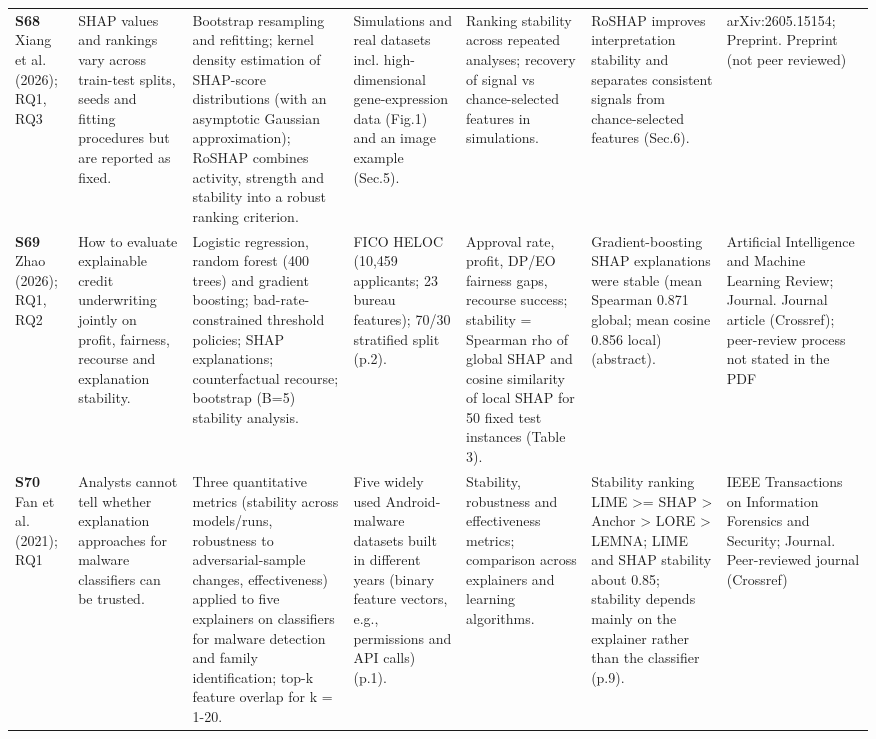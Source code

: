 \begin{longtable}{@{}P{1.55cm}P{2.9cm}P{4.5cm}P{3.2cm}P{3.4cm}P{4.6cm}P{3.6cm}@{}}
\textbf{S68} \cite{S68} Xiang et al. (2026); RQ1, RQ3 & SHAP values and rankings vary across train-test splits, seeds and fitting procedures but are reported as fixed. & Bootstrap resampling and refitting; kernel density estimation of SHAP-score distributions (with an asymptotic Gaussian approximation); RoSHAP combines activity, strength and stability into a robust ranking criterion. & Simulations and real datasets incl. high-dimensional gene-expression data (Fig.1) and an image example (Sec.5). & Ranking stability across repeated analyses; recovery of signal vs chance-selected features in simulations. & RoSHAP improves interpretation stability and separates consistent signals from chance-selected features (Sec.6). & arXiv:2605.15154; Preprint. Preprint (not peer reviewed) \\
\textbf{S69} \cite{S69} Zhao (2026); RQ1, RQ2 & How to evaluate explainable credit underwriting jointly on profit, fairness, recourse and explanation stability. & Logistic regression, random forest (400 trees) and gradient boosting; bad-rate-constrained threshold policies; SHAP explanations; counterfactual recourse; bootstrap (B=5) stability analysis. & FICO HELOC (10,459 applicants; 23 bureau features); 70/\allowbreak{}30 stratified split (p.2). & Approval rate, profit, DP/\allowbreak{}EO fairness gaps, recourse success; stability = Spearman rho of global SHAP and cosine similarity of local SHAP for 50 fixed test instances (Table 3). & Gradient-boosting SHAP explanations were stable (mean Spearman 0.871 global; mean cosine 0.856 local) (abstract). & Artificial Intelligence and Machine Learning Review; Journal. Journal article (Crossref); peer-review process not stated in the PDF \\
\textbf{S70} \cite{S70} Fan et al. (2021); RQ1 & Analysts cannot tell whether explanation approaches for malware classifiers can be trusted. & Three quantitative metrics (stability across models/\allowbreak{}runs, robustness to adversarial-sample changes, effectiveness) applied to five explainers on classifiers for malware detection and family identification; top-k feature overlap for k = 1-20. & Five widely used Android-malware datasets built in different years (binary feature vectors, e.g., permissions and API calls) (p.1). & Stability, robustness and effectiveness metrics; comparison across explainers and learning algorithms. & Stability ranking LIME \textgreater{}= SHAP \textgreater{} Anchor \textgreater{} LORE \textgreater{} LEMNA; LIME and SHAP stability about 0.85; stability depends mainly on the explainer rather than the classifier (p.9). & IEEE Transactions on Information Forensics and Security; Journal. Peer-reviewed journal (Crossref) \\

\end{longtable}
